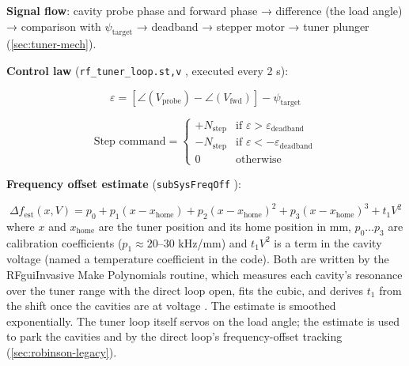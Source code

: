 \textbf{Signal flow}: cavity probe phase and forward phase → difference (the load angle) → comparison with \(\psi_\text{target}\) → deadband → stepper motor → tuner plunger (\cref{sec:tuner-mech}).

\textbf{Control law} (\texttt{rf\_\allowbreak{}tuner\_\allowbreak{}loop.\allowbreak{}st,\allowbreak{}v} , executed every 2 s):

\begin{equation}\label{eq:tuner-err}
\varepsilon = \left[\angle(V_\text{probe}) - \angle(V_\text{fwd})\right] - \psi_\text{target}
\end{equation}

\begin{equation}\label{eq:tuner-step}
\text{Step command} = \begin{cases} +N_\text{step} & \text{if } \varepsilon > \varepsilon_\text{deadband} \\ -N_\text{step} & \text{if } \varepsilon < -\varepsilon_\text{deadband} \\ 0 & \text{otherwise} \end{cases}
\end{equation}

\textbf{Frequency offset estimate} (\texttt{subSysFreqOff} ):

\begin{equation}\label{eq:tuner-poly}
\Delta f_\text{est}(x, V) = p_0 + p_1(x - x_\text{home}) + p_2(x - x_\text{home})^2 + p_3(x - x_\text{home})^3 + t_1 V^2
\end{equation}
where \(x\) and \(x_\text{home}\) are the tuner position and its home position in mm, \(p_0\ldots p_3\) are calibration coefficients (\(p_1 \approx 20\)--30 kHz/mm) and \(t_1 V^2\) is a term in the cavity voltage (named a temperature coefficient in the code). Both are written by the RFguiInvasive Make Polynomials routine, which measures each cavity's resonance over the tuner range with the direct loop open, fits the cubic, and derives \(t_1\) from the shift once the cavities are at voltage . The estimate is smoothed exponentially. The tuner loop itself servos on the load angle; the estimate is used to park the cavities and by the direct loop's frequency-offset tracking (\cref{sec:robinson-legacy}).

